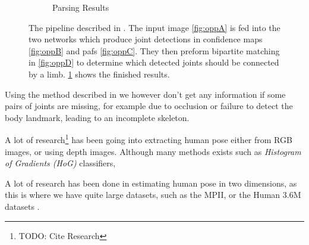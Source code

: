 \begin{figure}[h]
\begin{subfigure}[t]{0.24\textwidth}
    \caption{Parsing Results}
    \label{fig:oppE}
  \end{subfigure}
  \caption[OpenPose pipeline]{The pipeline described in \cite{cao2017realtime}. The input image
    \ref{fig:oppA} is fed into the two networks which produce joint detections in
    confidence maps \ref{fig:oppB} and \gls{paf}s \ref{fig:oppC}. They then preform
    bipartite matching in \ref{fig:oppD} to determine which detected joints should be
    connected by a limb. \ref{fig:oppE} shows the finished results.}
  \label{fig:openpose_pipeline}
\end{figure}

Using the method described in \cite{cao2017realtime} we however don't get any information if some pairs of joints are missing, for example due to occlusion or failure to detect the body landmark, leading to an incomplete skeleton.


A lot of research\footnote{TODO: Cite Research} has been going into extracting human pose either from RGB images, or using depth images. Although many methods exists such as \emph{Histogram of Gradients (HoG)} classifiers,

A lot of research has been done in estimating human pose in two dimensions, as this is where we have quite large datasets, such as the MPII, or the Human 3.6M datasets \cite{andriluka14cvpr,h36m_pami}.


